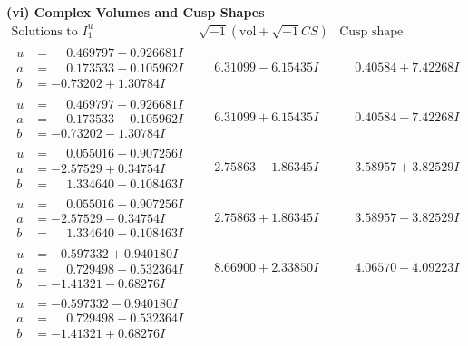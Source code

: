 \documentclass[1p]{elsarticle_modified}
\theoremstyle{definition}
\newcommand{\I}{\sqrt{-1}}
\begin{document}
\newpage\flushleft \textbf{(vi) Complex Volumes and Cusp Shapes}
$$\begin{array}{c|c|c}  
\text{Solutions to }I^u_{1}& \I (\text{vol} + \sqrt{-1}CS) & \text{Cusp shape}\\
 \hline 
\begin{aligned}
u &= \phantom{-}0.469797 + 0.926681 I \\
a &= \phantom{-}0.173533 + 0.105962 I \\
b &= -0.73202 + 1.30784 I\end{aligned}
 & \phantom{-}6.31099 - 6.15435 I & \phantom{-}0.40584 + 7.42268 I \\ \hline\begin{aligned}
u &= \phantom{-}0.469797 - 0.926681 I \\
a &= \phantom{-}0.173533 - 0.105962 I \\
b &= -0.73202 - 1.30784 I\end{aligned}
 & \phantom{-}6.31099 + 6.15435 I & \phantom{-}0.40584 - 7.42268 I \\ \hline\begin{aligned}
u &= \phantom{-}0.055016 + 0.907256 I \\
a &= -2.57529 + 0.34754 I \\
b &= \phantom{-}1.334640 - 0.108463 I\end{aligned}
 & \phantom{-}2.75863 - 1.86345 I & \phantom{-}3.58957 + 3.82529 I \\ \hline\begin{aligned}
u &= \phantom{-}0.055016 - 0.907256 I \\
a &= -2.57529 - 0.34754 I \\
b &= \phantom{-}1.334640 + 0.108463 I\end{aligned}
 & \phantom{-}2.75863 + 1.86345 I & \phantom{-}3.58957 - 3.82529 I \\ \hline\begin{aligned}
u &= -0.597332 + 0.940180 I \\
a &= \phantom{-}0.729498 - 0.532364 I \\
b &= -1.41321 - 0.68276 I\end{aligned}
 & \phantom{-}8.66900 + 2.33850 I & \phantom{-}4.06570 - 4.09223 I \\ \hline\begin{aligned}
u &= -0.597332 - 0.940180 I \\
a &= \phantom{-}0.729498 + 0.532364 I \\
b &= -1.41321 + 0.68276 I\end{aligned}

\end{array}$$
\end{document}

